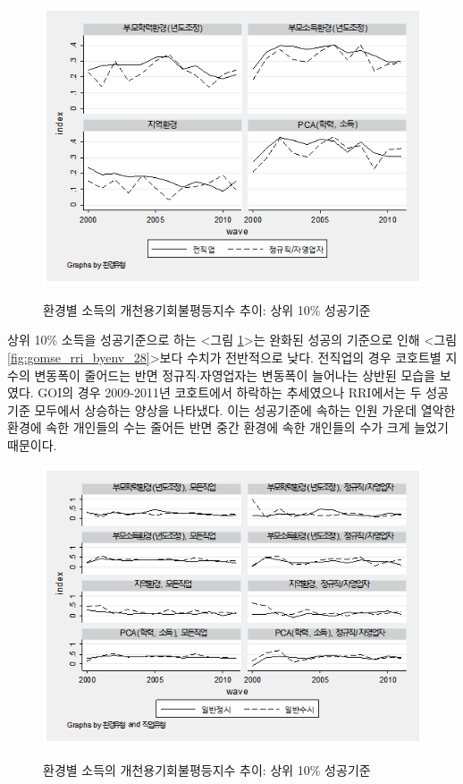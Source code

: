\begin{figure}
    \centering
    \caption{환경별 소득의 개천용기회불평등지수 추이: 상위 10\% 성공기준}
    \includegraphics[width=\textwidth]{figure/gomse_rri_byenv_10.png}
    \label{fig:gomse_rri_byenv_10}
\end{figure}

상위 10\% 소득을 성공기준으로 하는 <그림 \ref{fig:gomse_rri_byenv_10}>는 완화된 성공의 기준으로 인해 <그림 \ref{fig:gomse_rri_byenv_28}>보다 수치가 전반적으로 낮다.
 전직업의 경우 코호트별 지수의 변동폭이 줄어드는 반면 정규직$\cdot$자영업자는 변동폭이 늘어나는 상반된 모습을 보였다.
 GOI의 경우 2009-2011년 코호트에서 하락하는 추세였으나 RRI에서는 두 성공기준 모두에서 상승하는 양상을 나타냈다.
 이는 성공기준에 속하는 인원 가운데 열악한 환경에 속한 개인들의 수는 줄어든 반면 중간 환경에 속한 개인들의 수가 크게 늘었기 때문이다.

\begin{figure}
    \centering
    \caption{환경별 소득의 개천용기회불평등지수 추이: 상위 10\% 성공기준}
    \includegraphics[width=\textwidth]{figure/gomse_rri_byent_10.png}
    \label{fig:gomse_rri_byent_10}
\end{figure}

